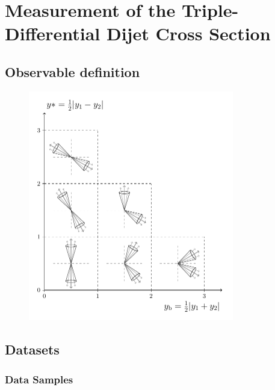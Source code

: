 
\chapter{Measurement of the Triple-Differential Dijet Cross Section}

\section{Observable definition}

\begin{figure}[htbp]
    \centering
    \includegraphics[width=0.8\textwidth]{figures/measurement/ybys.pdf}
    \caption{}
    \label{fig:trigger_eff}
\end{figure}


\section{Datasets}
\label{sec:datasets}

\subsection{Data Samples}

